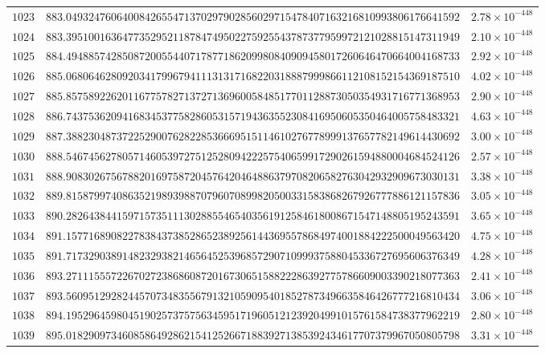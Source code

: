 \documentclass[12pt,reqno]{amsart}
\theoremstyle{remark}
\begin{document}
\begin{longtable}{clc}
$1023$ & $883.0493247606400842655471370297902856029715478407163216810993806176641592$ & $2.78\times 10^{-448}$ \\
$1024$ & $883.3951001636477352952118784749502275925543787377959972121028815147311949$ & $2.10\times 10^{-448}$ \\
$1025$ & $884.4948857428508720055440717877186209980840909458017260646470664004168733$ & $2.92\times 10^{-448}$ \\
$1026$ & $885.0680646280920341799679411131317168220318887999866112108152154369187510$ & $4.02\times 10^{-448}$ \\
$1027$ & $885.8575892262011677578271372713696005848517701128873050354931716771368953$ & $2.90\times 10^{-448}$ \\
$1028$ & $886.7437536209416834537758286053157194363552308416950605350464005758483321$ & $4.63\times 10^{-448}$ \\
$1029$ & $887.3882304873722529007628228536669515114610276778999137657782149614430692$ & $3.00\times 10^{-448}$ \\
$1030$ & $888.5467456278057146053972751252809422257540659917290261594880004684524126$ & $2.57\times 10^{-448}$ \\
$1031$ & $888.9083026756788201697587204576420464886379708206582763042932909673030131$ & $3.38\times 10^{-448}$ \\
$1032$ & $889.8158799740863521989398870796070899820500331583868267926777886121157836$ & $3.05\times 10^{-448}$ \\
$1033$ & $890.2826438441597157351113028855465403561912584618008671547148805195243591$ & $3.65\times 10^{-448}$ \\
$1034$ & $891.1577168908227838437385286523892561443695578684974001884222500049563420$ & $4.75\times 10^{-448}$ \\
$1035$ & $891.7173290389148232938214656452539685729071099937588045336727695606376349$ & $4.28\times 10^{-448}$ \\
$1036$ & $893.2711155572267027238686087201673065158822286392775786609003390218077363$ & $2.41\times 10^{-448}$ \\
$1037$ & $893.5609512928244570734835567913210590954018527873496635846426777216810434$ & $3.06\times 10^{-448}$ \\
$1038$ & $894.1952964598045190257375756345951719605121239204991015761584738377962219$ & $2.80\times 10^{-448}$ \\
$1039$ & $895.0182909734608586492862154125266718839271385392434617707379967050805798$ & $3.31\times 10^{-448}$ \\

\end{longtable}
\end{document}
